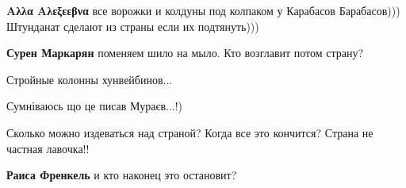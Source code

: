 \begin{itemize}
\begin{itemize}
\textbf{Αλλα Αλεξεεβνα} все ворожки и колдуны под колпаком у Карабасов Барабасов)))
Штунданат сделают из страны если их подтянуть)))

 
\textbf{Сурен Маркарян} поменяем шило на мыло. Кто возглавит потом страну?

 
Стройные колонны хунвейбинов...

\end{itemize}

 
Сумніваюсь що це писав Мураєв...!)

\par
 
Сколько можно издеваться над страной? Когда все это кончится? Страна не частная лавочка!!

\begin{itemize}
 
\textbf{Раиса Френкель} и кто наконец это остановит?

 

\end{itemize}
\end{itemize}
